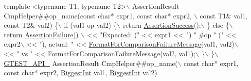 \begin{DoxyCode}
\textcolor{keyword}{template} <\textcolor{keyword}{typename} T1, \textcolor{keyword}{typename} T2>\(\backslash\)
AssertionResult CmpHelper##op\_name(\textcolor{keyword}{const} \textcolor{keywordtype}{char}* expr1, \textcolor{keyword}{const} \textcolor{keywordtype}{char}* expr2, \(\backslash\)
                                   \textcolor{keyword}{const} T1& val1, \textcolor{keyword}{const} T2& val2) \{\(\backslash\)
  if (val1 op val2) \{\(\backslash\)
    return \hyperlink{namespacetesting_ac1d0baedb17286c5c6c87bd1a45da8ac}{AssertionSuccess}();\(\backslash\)
  \} \textcolor{keywordflow}{else} \{\(\backslash\)
    return \hyperlink{namespacetesting_a75cb789614cb1c28c34627a4a3c053df}{AssertionFailure}() \(\backslash\)
        << \textcolor{stringliteral}{"Expected: ("} << expr1 << \textcolor{stringliteral}{") "} #op \textcolor{stringliteral}{" ("} << expr2\(\backslash\)
        << \textcolor{stringliteral}{"), actual: "} << \hyperlink{namespacetesting_1_1internal_a91ab078f10adc669f09b7f604975c518}{FormatForComparisonFailureMessage}(val1, val2)\(\backslash\)
        << \textcolor{stringliteral}{" vs "} << \hyperlink{namespacetesting_1_1internal_a91ab078f10adc669f09b7f604975c518}{FormatForComparisonFailureMessage}(val2, val1);\(\backslash\)
  \}\(\backslash\)
\}\hyperlink{fused-src_2gtest_2gtest_8h_aa73be6f0ba4a7456180a94904ce17790}{\(\backslash\)}
\hyperlink{fused-src_2gtest_2gtest_8h_aa73be6f0ba4a7456180a94904ce17790}{GTEST\_API\_} AssertionResult CmpHelper##op\_name(\(\backslash\)
    \textcolor{keyword}{const} \textcolor{keywordtype}{char}* expr1, \textcolor{keyword}{const} \textcolor{keywordtype}{char}* expr2, \hyperlink{namespacetesting_1_1internal_a05c6bd9ede5ccdf25191a590d610dcc6}{BiggestInt} val1, \hyperlink{namespacetesting_1_1internal_a05c6bd9ede5ccdf25191a590d610dcc6}{BiggestInt} val2)
\end{DoxyCode}
